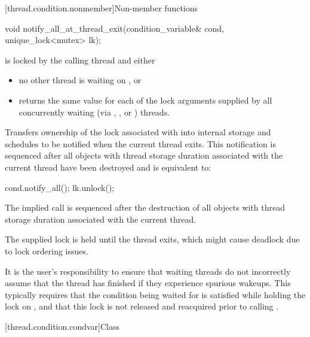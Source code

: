 [thread.condition.nonmember]{Non-member functions}
%
\begin{itemdecl}
void notify_all_at_thread_exit(condition_variable& cond, unique_lock<mutex> lk);
\end{itemdecl}

\begin{itemdescr}
\pnum
\expects
{} is locked by the calling thread and either
\begin{itemize}
\item no other thread is waiting on , or
\item {} returns the same value for each of the lock arguments
supplied by all concurrently waiting (via , ,
or ) threads.
\end{itemize}

\pnum
\effects
Transfers ownership of the lock associated with  into
internal storage and schedules  to be notified when the current
thread exits.
This notification is sequenced after
all objects with thread storage duration associated with
the current thread have been destroyed and
is equivalent to:
\begin{codeblock}
cond.notify_all();
lk.unlock();
\end{codeblock}

\pnum
\sync
The implied  call is sequenced after the destruction of
all objects with thread storage duration associated with the current thread.

\pnum
\begin{note}
The supplied lock is held until the thread exits,
which might cause deadlock due to lock ordering issues.
\end{note}

\pnum
\begin{note}
It is the user's responsibility to ensure that waiting threads
do not incorrectly assume that the thread has finished if they experience
spurious wakeups. This typically requires that the condition being waited
for is satisfied while holding the lock on , and that this lock
is not released and reacquired prior to calling .
\end{note}
\end{itemdescr}

[thread.condition.condvar]{Class }

